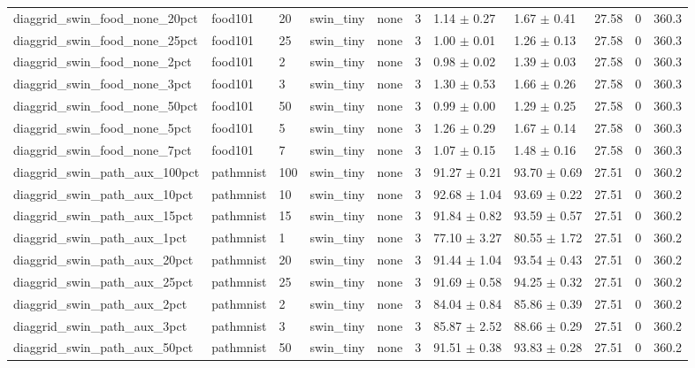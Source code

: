 \begin{tabular}{lllllllllll}
diaggrid_swin_food_none_20pct & food101 & 20 & swin_tiny & none & 3 & 1.14 $\pm$ 0.27 & 1.67 $\pm$ 0.41 & 27.58 & 0 & 360.3 \\
diaggrid_swin_food_none_25pct & food101 & 25 & swin_tiny & none & 3 & 1.00 $\pm$ 0.01 & 1.26 $\pm$ 0.13 & 27.58 & 0 & 360.3 \\
diaggrid_swin_food_none_2pct & food101 & 2 & swin_tiny & none & 3 & 0.98 $\pm$ 0.02 & 1.39 $\pm$ 0.03 & 27.58 & 0 & 360.3 \\
diaggrid_swin_food_none_3pct & food101 & 3 & swin_tiny & none & 3 & 1.30 $\pm$ 0.53 & 1.66 $\pm$ 0.26 & 27.58 & 0 & 360.3 \\
diaggrid_swin_food_none_50pct & food101 & 50 & swin_tiny & none & 3 & 0.99 $\pm$ 0.00 & 1.29 $\pm$ 0.25 & 27.58 & 0 & 360.3 \\
diaggrid_swin_food_none_5pct & food101 & 5 & swin_tiny & none & 3 & 1.26 $\pm$ 0.29 & 1.67 $\pm$ 0.14 & 27.58 & 0 & 360.3 \\
diaggrid_swin_food_none_7pct & food101 & 7 & swin_tiny & none & 3 & 1.07 $\pm$ 0.15 & 1.48 $\pm$ 0.16 & 27.58 & 0 & 360.3 \\
diaggrid_swin_path_aux_100pct & pathmnist & 100 & swin_tiny & none & 3 & 91.27 $\pm$ 0.21 & 93.70 $\pm$ 0.69 & 27.51 & 0 & 360.2 \\
diaggrid_swin_path_aux_10pct & pathmnist & 10 & swin_tiny & none & 3 & 92.68 $\pm$ 1.04 & 93.69 $\pm$ 0.22 & 27.51 & 0 & 360.2 \\
diaggrid_swin_path_aux_15pct & pathmnist & 15 & swin_tiny & none & 3 & 91.84 $\pm$ 0.82 & 93.59 $\pm$ 0.57 & 27.51 & 0 & 360.2 \\
diaggrid_swin_path_aux_1pct & pathmnist & 1 & swin_tiny & none & 3 & 77.10 $\pm$ 3.27 & 80.55 $\pm$ 1.72 & 27.51 & 0 & 360.2 \\
diaggrid_swin_path_aux_20pct & pathmnist & 20 & swin_tiny & none & 3 & 91.44 $\pm$ 1.04 & 93.54 $\pm$ 0.43 & 27.51 & 0 & 360.2 \\
diaggrid_swin_path_aux_25pct & pathmnist & 25 & swin_tiny & none & 3 & 91.69 $\pm$ 0.58 & 94.25 $\pm$ 0.32 & 27.51 & 0 & 360.2 \\
diaggrid_swin_path_aux_2pct & pathmnist & 2 & swin_tiny & none & 3 & 84.04 $\pm$ 0.84 & 85.86 $\pm$ 0.39 & 27.51 & 0 & 360.2 \\
diaggrid_swin_path_aux_3pct & pathmnist & 3 & swin_tiny & none & 3 & 85.87 $\pm$ 2.52 & 88.66 $\pm$ 0.29 & 27.51 & 0 & 360.2 \\
diaggrid_swin_path_aux_50pct & pathmnist & 50 & swin_tiny & none & 3 & 91.51 $\pm$ 0.38 & 93.83 $\pm$ 0.28 & 27.51 & 0 & 360.2 \\

\end{tabular}
